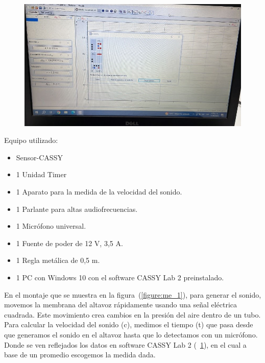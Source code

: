 \documentclass[twocolumn, 12pt]{article}
\begin{document}
\begin{figure}[H]
    \includegraphics[width=\linewidth]{./Images/Imagen4.jpg}
    \caption{}
    \label{figure:me_2}
\end{figure}

Equipo utilizado:

\begin{itemize}
    \item Sensor\@{}-CASSY

    \item 1 Unidad Timer

    \item 1 Aparato para la medida de la velocidad del sonido.

    \item 1 Parlante para altas audiofrecuencias.

    \item 1 Micrófono universal.

    \item 1 Fuente de poder de 12 V, 3,5 A.

    \item 1 Regla metálica de 0,5 m.

    \item 1 PC con Windows 10 con el software CASSY Lab 2 preinstalado.
\end{itemize}

En el montaje que se muestra en la
figura~(\ref{figure:me_1}), para generar el sonido, movemos
la membrana del altavoz rápidamente usando una señal
eléctrica cuadrada. Este movimiento crea cambios en la
presión del aire dentro de un tubo. Para calcular la
velocidad del sonido (c), medimos el tiempo (t) que pasa
desde que generamos el sonido en el altavoz hasta que lo
detectamos con un micrófono. Donde se ven reflejados los
datos en software CASSY Lab 2 (~\ref{figure:me_2}), en el
cual a base de un promedio escogemos la medida dada.
\end{document}
